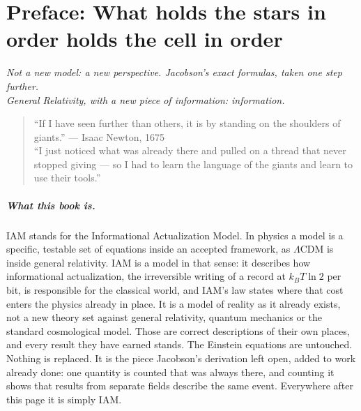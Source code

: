 \chapter*{Preface: What holds the stars in order holds the cell in order}

\begin{center}\itshape Not a new model: a new perspective. Jacobson's exact formulas, taken one step further.\\
General Relativity, with a new piece of information: information.\end{center}


\begin{quote}``If I have seen further than others, it is by standing on the shoulders of giants.'' --- Isaac Newton, 1675\\[2pt]
``I just noticed what was already there and pulled on a thread that never stopped giving --- so I had to learn the language of the giants and
learn to use their tools.''\end{quote}

\paragraph{What this book is.} IAM stands for the Informational Actualization Model. In physics a model is a specific, testable set of
equations inside an accepted framework, as $\Lambda$CDM is inside general relativity. IAM is a model in that sense: it describes how
informational actualization, the irreversible writing of a record at $k_BT\ln2$ per bit, is responsible for the classical world, and IAM's law
states where that cost enters the physics already in place. It is a model of reality as it already exists, not a new theory set against general
relativity, quantum mechanics or the standard cosmological model. Those are correct descriptions of their own places, and every result they have
earned stands. The Einstein equations are untouched. Nothing is replaced. It is the piece Jacobson's derivation left open, added to work already
done: one quantity is counted that was always there, and counting it shows that results from separate fields describe the same event. Everywhere
after this page it is simply IAM.

